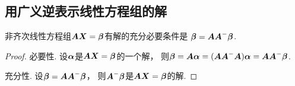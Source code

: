 \subsection{用广义逆表示线性方程组的解}
\begin{theorem}[非齐次线性方程组的相容性定理]\label{theorem:线性方程组.非齐次线性方程组的相容性定理}
非齐次线性方程组\(\boldsymbol{A} \boldsymbol{X} = \boldsymbol\beta\)有解的充分必要条件是
\(\boldsymbol\beta = \boldsymbol{A} \boldsymbol{A}^- \boldsymbol\beta\).
\begin{proof}
必要性.
设\(\boldsymbol\alpha\)是\(\boldsymbol{A} \boldsymbol{X} = \boldsymbol\beta\)的一个解，
则\(
	\boldsymbol\beta
	= \boldsymbol{A} \boldsymbol\alpha
	= (\boldsymbol{A} \boldsymbol{A}^- \boldsymbol{A}) \boldsymbol\alpha
	= \boldsymbol{A} \boldsymbol{A}^- \boldsymbol\beta
\).

充分性.
设\(\boldsymbol\beta = \boldsymbol{A} \boldsymbol{A}^- \boldsymbol\beta\)，
则\(\boldsymbol{A}^- \boldsymbol\beta\)是\(\boldsymbol{A} \boldsymbol{X} = \boldsymbol\beta\)的解.
\end{proof}
\end{theorem}

